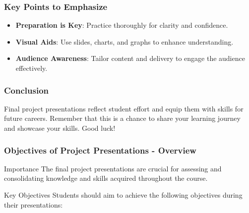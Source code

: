 \documentclass[aspectratio=169]{beamer}
\begin{document}
\begin{frame}[fragile]
    \frametitle{Key Points to Emphasize}
    \begin{itemize}
        \item \textbf{Preparation is Key}: Practice thoroughly for clarity and confidence.
        \item \textbf{Visual Aids}: Use slides, charts, and graphs to enhance understanding.
        \item \textbf{Audience Awareness}: Tailor content and delivery to engage the audience effectively.
    \end{itemize}
\end{frame}

\begin{frame}[fragile]
    \frametitle{Conclusion}
    Final project presentations reflect student effort and equip them with skills for future careers. Remember that this is a chance to share your learning journey and showcase your skills. Good luck!
\end{frame}

\begin{frame}[fragile]
    \frametitle{Objectives of Project Presentations - Overview}
    \begin{block}{Importance}
    The final project presentations are crucial for assessing and consolidating knowledge and skills acquired throughout the course.
    \end{block}
    
    \begin{block}{Key Objectives}
    Students should aim to achieve the following objectives during their presentations:
    \end{block}
\end{frame}
\end{document}
